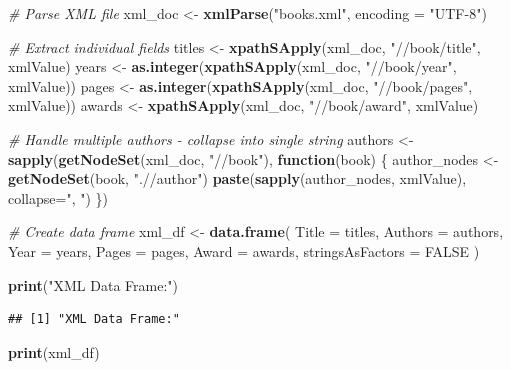 \documentclass[
]{article}
\newenvironment{Shaded}{\begin{snugshade}}{\end{snugshade}}
\newcommand{\AttributeTok}[1]{\textcolor[rgb]{0.13,0.29,0.53}{#1}}
\newcommand{\CommentTok}[1]{\textcolor[rgb]{0.56,0.35,0.01}{\textit{#1}}}
\newcommand{\ConstantTok}[1]{\textcolor[rgb]{0.56,0.35,0.01}{#1}}
\newcommand{\ControlFlowTok}[1]{\textcolor[rgb]{0.13,0.29,0.53}{\textbf{#1}}}
\newcommand{\FunctionTok}[1]{\textcolor[rgb]{0.13,0.29,0.53}{\textbf{#1}}}
\newcommand{\NormalTok}[1]{#1}
\newcommand{\OtherTok}[1]{\textcolor[rgb]{0.56,0.35,0.01}{#1}}
\newcommand{\StringTok}[1]{\textcolor[rgb]{0.31,0.60,0.02}{#1}}
\begin{document}
\begin{Shaded}
\begin{Highlighting}[]
\CommentTok{\# Parse XML file}
\NormalTok{xml\_doc }\OtherTok{\textless{}{-}} \FunctionTok{xmlParse}\NormalTok{(}\StringTok{"books.xml"}\NormalTok{, }\AttributeTok{encoding =} \StringTok{"UTF{-}8"}\NormalTok{)}

\CommentTok{\# Extract individual fields}
\NormalTok{titles }\OtherTok{\textless{}{-}} \FunctionTok{xpathSApply}\NormalTok{(xml\_doc, }\StringTok{"//book/title"}\NormalTok{, xmlValue)}
\NormalTok{years }\OtherTok{\textless{}{-}} \FunctionTok{as.integer}\NormalTok{(}\FunctionTok{xpathSApply}\NormalTok{(xml\_doc, }\StringTok{"//book/year"}\NormalTok{, xmlValue))}
\NormalTok{pages }\OtherTok{\textless{}{-}} \FunctionTok{as.integer}\NormalTok{(}\FunctionTok{xpathSApply}\NormalTok{(xml\_doc, }\StringTok{"//book/pages"}\NormalTok{, xmlValue))}
\NormalTok{awards }\OtherTok{\textless{}{-}} \FunctionTok{xpathSApply}\NormalTok{(xml\_doc, }\StringTok{"//book/award"}\NormalTok{, xmlValue)}

\CommentTok{\# Handle multiple authors {-} collapse into single string}
\NormalTok{authors }\OtherTok{\textless{}{-}} \FunctionTok{sapply}\NormalTok{(}\FunctionTok{getNodeSet}\NormalTok{(xml\_doc, }\StringTok{"//book"}\NormalTok{), }\ControlFlowTok{function}\NormalTok{(book) \{}
\NormalTok{  author\_nodes }\OtherTok{\textless{}{-}} \FunctionTok{getNodeSet}\NormalTok{(book, }\StringTok{".//author"}\NormalTok{)}
  \FunctionTok{paste}\NormalTok{(}\FunctionTok{sapply}\NormalTok{(author\_nodes, xmlValue), }\AttributeTok{collapse=}\StringTok{", "}\NormalTok{)}
\NormalTok{\})}

\CommentTok{\# Create data frame}
\NormalTok{xml\_df }\OtherTok{\textless{}{-}} \FunctionTok{data.frame}\NormalTok{(}
  \AttributeTok{Title =}\NormalTok{ titles,}
  \AttributeTok{Authors =}\NormalTok{ authors,}
  \AttributeTok{Year =}\NormalTok{ years,}
  \AttributeTok{Pages =}\NormalTok{ pages,}
  \AttributeTok{Award =}\NormalTok{ awards,}
  \AttributeTok{stringsAsFactors =} \ConstantTok{FALSE}
\NormalTok{)}

\FunctionTok{print}\NormalTok{(}\StringTok{"XML Data Frame:"}\NormalTok{)}
\end{Highlighting}
\end{Shaded}

\begin{verbatim}
## [1] "XML Data Frame:"
\end{verbatim}

\begin{Shaded}
\begin{Highlighting}[]
\FunctionTok{print}\NormalTok{(xml\_df)}
\end{Highlighting}
\end{Shaded}
\end{document}
